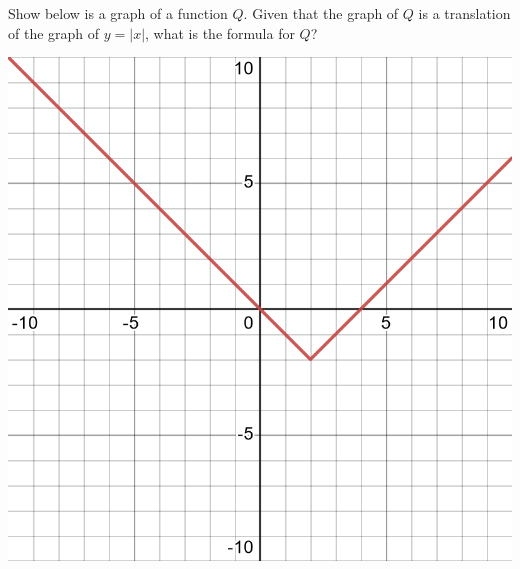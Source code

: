 \documentclass[12pt,fleqn]{exam}
\begin{document}
\begin{questions}
\begin{parts}
\end{parts}

\question [5] Show below is a graph of a function $Q$. Given that the
 graph of $Q$ is a translation of the graph of $y=|x|$, what is the formula
 for $Q$?

 \begin{centering}
 \includegraphics[scale=0.25]{desmos-graph(24).png}
 \end{centering}
 
\end{questions}
\end{document}
